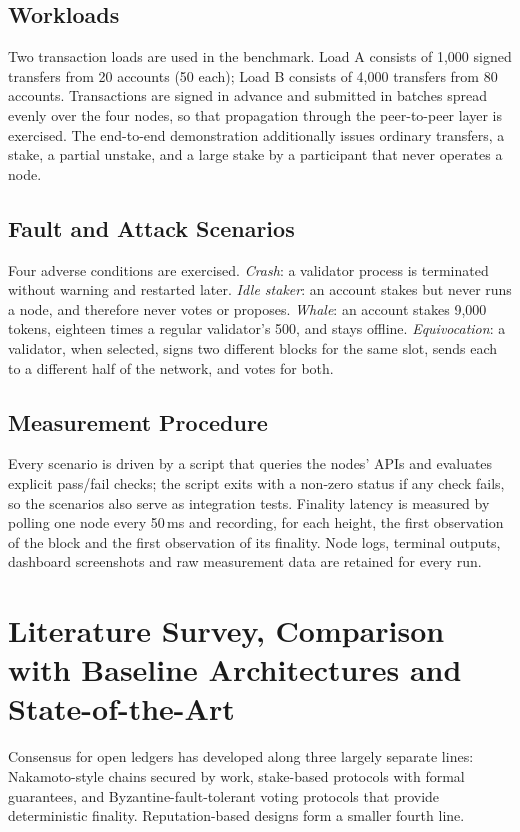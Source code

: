 \documentclass[conference]{IEEEtran}
\begin{document}
\subsection{Workloads}
Two transaction loads are used in the benchmark. Load A consists of 1{,}000 signed transfers from 20 accounts (50 each); Load B consists of 4{,}000 transfers from 80 accounts. Transactions are signed in advance and submitted in batches spread evenly over the four nodes, so that propagation through the peer-to-peer layer is exercised. The end-to-end demonstration additionally issues ordinary transfers, a stake, a partial unstake, and a large stake by a participant that never operates a node.

\subsection{Fault and Attack Scenarios}
Four adverse conditions are exercised. \emph{Crash}: a validator process is terminated without warning and restarted later. \emph{Idle staker}: an account stakes but never runs a node, and therefore never votes or proposes. \emph{Whale}: an account stakes 9{,}000 tokens, eighteen times a regular validator's 500, and stays offline. \emph{Equivocation}: a validator, when selected, signs two different blocks for the same slot, sends each to a different half of the network, and votes for both.

\subsection{Measurement Procedure}
Every scenario is driven by a script that queries the nodes' APIs and evaluates explicit pass/fail checks; the script exits with a non-zero status if any check fails, so the scenarios also serve as integration tests. Finality latency is measured by polling one node every 50\,ms and recording, for each height, the first observation of the block and the first observation of its finality. Node logs, terminal outputs, dashboard screenshots and raw measurement data are retained for every run.

\section{Literature Survey, Comparison with Baseline Architectures and State-of-the-Art}
Consensus for open ledgers has developed along three largely separate lines: Nakamoto-style chains secured by work, stake-based protocols with formal guarantees, and Byzantine-fault-tolerant voting protocols that provide deterministic finality. Reputation-based designs form a smaller fourth line.
\end{document}
